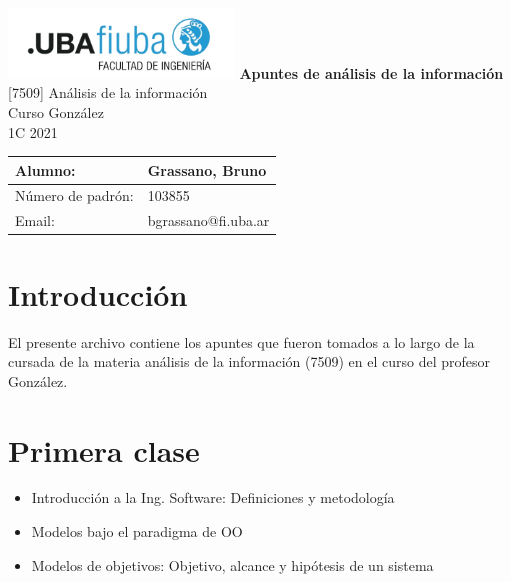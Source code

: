 \documentclass[titlepage,a4paper]{article}
\begin{document}
\begin{titlepage} %
	\hfill\includegraphics[width=6cm]{logofiuba.jpg}
    \centering
    \vfill
    \Huge \textbf{Apuntes de análisis de la información}
    \vskip2cm
    \Large [7509] Análisis de la información\\
    Curso González \\
    1C 2021 
    \vfill
    \begin{tabular}{ | l | l | } %
      \hline
      Alumno: & Grassano, Bruno \\ \hline
      Número de padrón: & 103855 \\ \hline
      Email: & bgrassano@fi.uba.ar \\ \hline
  	\end{tabular}
    \vfill
    \vfill
\end{titlepage}

\tableofcontents %

\newpage

\section{Introducción}\label{sec:intro}
El presente archivo contiene los apuntes que fueron tomados a lo largo de la cursada de la materia análisis de la información (7509) en el curso del profesor González.



\section*{Primera clase}

    \begin{itemize}
        \item Introducción a la Ing. Software: Definiciones y metodología
        \item Modelos bajo el paradigma de OO
        \item Modelos de objetivos: Objetivo, alcance y hipótesis de un sistema
    \end{itemize}
\end{document}
